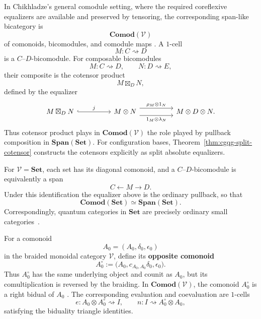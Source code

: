 \documentclass[oneside]{article}
\newcommand{\Span}{\mathbf{Span}}
\theoremstyle{plain}
\theoremstyle{definition}
\theoremstyle{remark}
\begin{document}
In Chikhladze's general comodule setting, where the required coreflexive
equalizers are available and preserved by tensoring, the corresponding span-like
bicategory is
\[
    \mathbf{Comod}(\mathcal V)
\]
of comonoids, bicomodules, and comodule maps
\cite[\S3]{Chikhladze2011QuantumCategories}. A \(1\)-cell
\[
    M:C\rightsquigarrow{} D
\]
is a \(C\)--\(D\)-bicomodule. For composable bicomodules
\[
    M:C\rightsquigarrow{} D,
    \qquad
    N:D\rightsquigarrow{} E,
\]
their composite is the cotensor product
\[
    M\boxtimes_DN,
\]
defined by the equalizer
\begin{equation}
    \begin{tikzcd}[column sep=huge]
        M\boxtimes_DN
            \arrow[r,hook,"j"]
        &
        M\otimes N
            \arrow[r,shift left=1.2ex,"\rho_M\otimes1_N"]
            \arrow[r,shift right=1.2ex,"1_M\otimes\lambda_N"']
        &
        M\otimes D\otimes N .
    \end{tikzcd}
    \label{eq:cgqg-background-comodule-composition}
\end{equation}
Thus cotensor product plays in \(\mathbf{Comod}(\mathcal V)\) the role played by pullback composition in \(\Span(\mathbf{Set})\). For configuration bases, Theorem~\ref{thm:cgqg-split-cotensor} constructs the cotensors explicitly as split absolute equalizers.

For \(\mathcal V=\mathbf{Set}\), each set has its diagonal comonoid, and a \(C\)--\(D\)-bicomodule is equivalently a span
\[
    C\xleftarrow{}M\xrightarrow{}D.
\]
Under this identification the equalizer above is the ordinary pullback, so that
\[
    \mathbf{Comod}(\mathbf{Set})
    \simeq
    \Span(\mathbf{Set}).
\]
Correspondingly, quantum categories in \(\mathbf{Set}\) are precisely ordinary small categories~\cite[Def.~5.2, p.~13]{Chikhladze2011QuantumCategories}.

For a comonoid
\[
    A_0=(A_0,\delta_0,\epsilon_0)
\]
in the braided monoidal category \(\mathcal V\), define its \textbf{opposite comonoid}
\[
    A_0^\circ
    :=
    \bigl(A_0,c_{A_0,A_0}\delta_0,\epsilon_0\bigr).
\]
Thus \(A_0^\circ\) has the same underlying object and counit as \(A_0\), but its comultiplication is reversed by the braiding. In \(\mathbf{Comod}(\mathcal V)\), the comonoid \(A_0^\circ\) is a right bidual of \(A_0\) \cite[\S3]{Chikhladze2011QuantumCategories}. The corresponding evaluation and coevaluation are \(1\)-cells
\[
    e:
    A_0\otimes A_0^\circ
    \rightsquigarrow{} I,
    \qquad
    n:
    I
    \rightsquigarrow{} A_0^\circ\otimes A_0,
\]
satisfying the biduality triangle identities.
\end{document}
